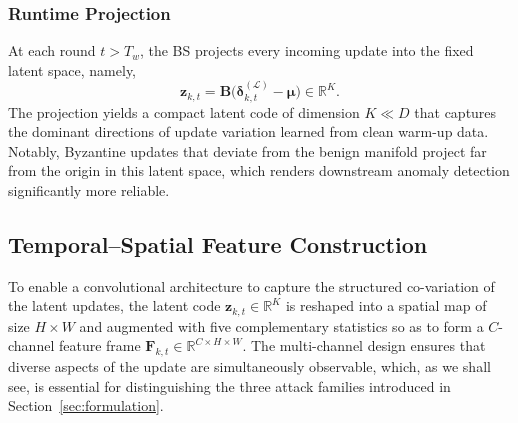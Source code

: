 \documentclass[journal]{IEEEtran}
\begin{document}
\subsubsection{Runtime Projection}
At each round $t > T_w$, the BS projects every incoming update into the fixed latent space, namely,
\begin{equation}
\mathbf{z}_{k,t} = \mathbf{B}\bigl(\boldsymbol{\delta}_{k,t}^{(\mathcal{L})} - \boldsymbol{\mu}\bigr) \in \mathbb{R}^K.
\label{eq:projection}
\end{equation}
The projection yields a compact latent code of dimension $K \ll D$ that captures the dominant directions of update variation learned from clean warm-up data. Notably, Byzantine updates that deviate from the benign manifold project far from the origin in this latent space, which renders downstream anomaly detection significantly more reliable.

\subsection{Temporal--Spatial Feature Construction}

To enable a convolutional architecture to capture the structured co-variation of the latent updates, the latent code $\mathbf{z}_{k,t} \in \mathbb{R}^K$ is reshaped into a spatial map of size $H \times W$ and augmented with five complementary statistics so as to form a $C$-channel feature frame $\mathbf{F}_{k,t} \in \mathbb{R}^{C \times H \times W}$. The multi-channel design ensures that diverse aspects of the update are simultaneously observable, which, as we shall see, is essential for distinguishing the three attack families introduced in Section~\ref{sec:formulation}.
\end{document}
